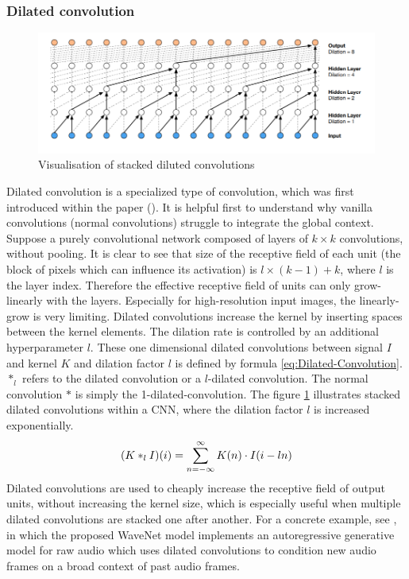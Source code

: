 \subsubsection{Dilated convolution}
\label{subsub:Dilated-Convolution}
\begin{figure}[htbp]
	\centering
	\includegraphics[scale=0.9]{img/Dilated_Colvolution.png}
	\caption[SINS database recording environment map]{Visualisation of stacked diluted convolutions\footnotemark}
	\label{fig:Dilated-Convolution}
\end{figure}
\noindent
Dilated convolution is a specialized type of convolution, which was first introduced within the paper (\cite{yu_multi-scale_2016}). It is helpful first to understand why vanilla convolutions (normal convolutions) struggle to integrate the global context. Suppose a purely convolutional network composed of layers of $k \times k$ convolutions, without pooling. It is clear to see that size of the receptive field of each unit (the block of pixels which can influence its activation) is $l \times (k-1) + k$, where $l$ is the layer index. Therefore the effective receptive field of units can only grow-linearly with the layers. Especially for high-resolution input images, the linearly-grow is very limiting.
\newline
\newline
Dilated convolutions increase the kernel by inserting spaces between the kernel elements. The dilation rate is controlled by an additional hyperparameter $l$. These one dimensional dilated convolutions between signal $I$ and kernel $K$ and dilation factor $l$ is defined by formula \ref{eq:Dilated-Convolution}. $\ast_l$ refers to the dilated convolution or a $l$-dilated convolution. The normal convolution $\ast$ is simply the 1-dilated-convolution. The figure \ref{fig:Dilated-Convolution} illustrates stacked dilated convolutions within a \gls{CNN}, where the dilation factor $l$ is increased exponentially.
\begin{equation}
    \centering
    (K \ast_l I)(i) = \sum_{n=-\infty}^\infty K(n) \cdot I(i - ln)
    \label{eq:Dilated-Convolution}
\end{equation}
Dilated convolutions are used to cheaply increase the receptive field of output units, without increasing the kernel size, which is especially useful when multiple dilated convolutions are stacked one after another. For a concrete example, see \cite{oord_wavenet_2016}, in which the proposed WaveNet model implements an autoregressive generative model for raw audio which uses dilated convolutions to condition new audio frames on a broad context of past audio frames.

